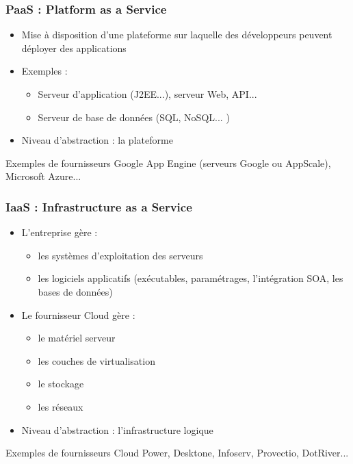 \begin{frame}
\frametitle{PaaS : Platform as a Service}
\begin{itemize}
\item Mise à disposition d'une plateforme sur laquelle des développeurs peuvent déployer des applications
\item Exemples :
\begin{itemize}
\item Serveur d'application (J2EE...), serveur Web, API...
\item Serveur de base de données (SQL, NoSQL... )
\end{itemize}
\item Niveau d'abstraction : la plateforme
\end{itemize}
\begin{exampleblock}{Exemples de fournisseurs}
Google App Engine (serveurs Google ou AppScale), Microsoft Azure...
\end{exampleblock}
\end{frame}

\begin{frame}
\frametitle{IaaS : Infrastructure as a Service}
\begin{itemize}
\item L'entreprise gère :
\begin{itemize}
\item les systèmes d'exploitation des serveurs
\item les logiciels applicatifs (exécutables, paramétrages, l'intégration SOA, les bases de données)
\end{itemize}
\item Le fournisseur Cloud gère :
\begin{itemize}
\item le matériel serveur
\item les couches de virtualisation
\item le stockage
\item les réseaux
\end{itemize}
\item Niveau d'abstraction : l'infrastructure logique
\end{itemize}
\begin{exampleblock}{Exemples de fournisseurs}
Cloud Power, Desktone, Infoserv, Provectio, DotRiver...
\end{exampleblock}
\end{frame}

